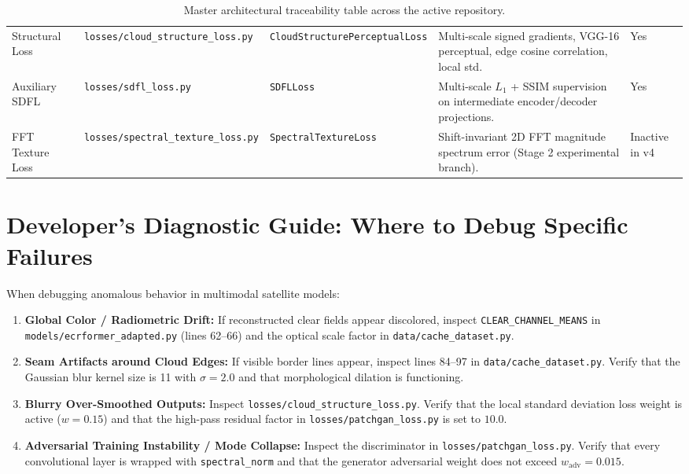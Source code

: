 \begin{table}[htbp]
\begin{tabularx}{\textwidth}{llp{3.2cm}Xl}
Structural Loss & \texttt{losses/cloud\_structure\_loss.py} & \texttt{CloudStructurePerceptualLoss} & Multi-scale signed gradients, VGG-16 perceptual, edge cosine correlation, local std. & Yes \\
Auxiliary SDFL & \texttt{losses/sdfl\_loss.py} & \texttt{SDFLLoss} & Multi-scale $L_1$ + SSIM supervision on intermediate encoder/decoder projections. & Yes \\
FFT Texture Loss & \texttt{losses/spectral\_texture\_loss.py} & \texttt{SpectralTextureLoss} & Shift-invariant 2D FFT magnitude spectrum error (Stage 2 experimental branch). & Inactive in v4 \\
\bottomrule
\end{tabularx}
\caption{Master architectural traceability table across the active repository.}
\label{tab:code_traceability}
\end{table}

\section{Developer's Diagnostic Guide: Where to Debug Specific Failures}
When debugging anomalous behavior in multimodal satellite models:
\begin{enumerate}
    \item \textbf{Global Color / Radiometric Drift:} If reconstructed clear fields appear discolored, inspect \texttt{CLEAR\_CHANNEL\_MEANS} in \texttt{models/ecrformer\_adapted.py} (lines 62--66) and the optical scale factor in \texttt{data/cache\_dataset.py}.
    \item \textbf{Seam Artifacts around Cloud Edges:} If visible border lines appear, inspect lines 84--97 in \texttt{data/cache\_dataset.py}. Verify that the Gaussian blur kernel size is 11 with $\sigma=2.0$ and that morphological dilation is functioning.
    \item \textbf{Blurry Over-Smoothed Outputs:} Inspect \texttt{losses/cloud\_structure\_loss.py}. Verify that the local standard deviation loss weight is active ($w=0.15$) and that the high-pass residual factor in \texttt{losses/patchgan\_loss.py} is set to $10.0$.
    \item \textbf{Adversarial Training Instability / Mode Collapse:} Inspect the discriminator in \texttt{losses/patchgan\_loss.py}. Verify that every convolutional layer is wrapped with \texttt{spectral\_norm} and that the generator adversarial weight does not exceed $w_{\text{adv}} = 0.015$.
\end{enumerate}

